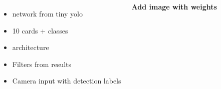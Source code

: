 \documentclass[25pt, a0paper, landscape]{tikzposter}
\begin{document}
\begin{columns}
{\begin{minipage}{\columnwidth}
\begin{minipage}{800 pt}
\begin{tikzfigure}
				        		\label{fig:predictions}
				        	\end{tikzfigure}
			    		  	\end{minipage}
			    		  	\hspace{50 pt}
			    		  	\begin{minipage}{500 pt}
					        	\begin{itemize}
					        		
					        		\item network from tiny yolo
					        		
					        		\item 10 cards + classes
					        		
					        		\item architecture
					        		
					        		
					        		\item Filters from results
					        		
					        		\item Camera input with detection labels
					        	\end{itemize}
			    		  	\end{minipage}
			\end{minipage}
			\bfseries Add image with weights
        }
\end{columns}
\end{document}

